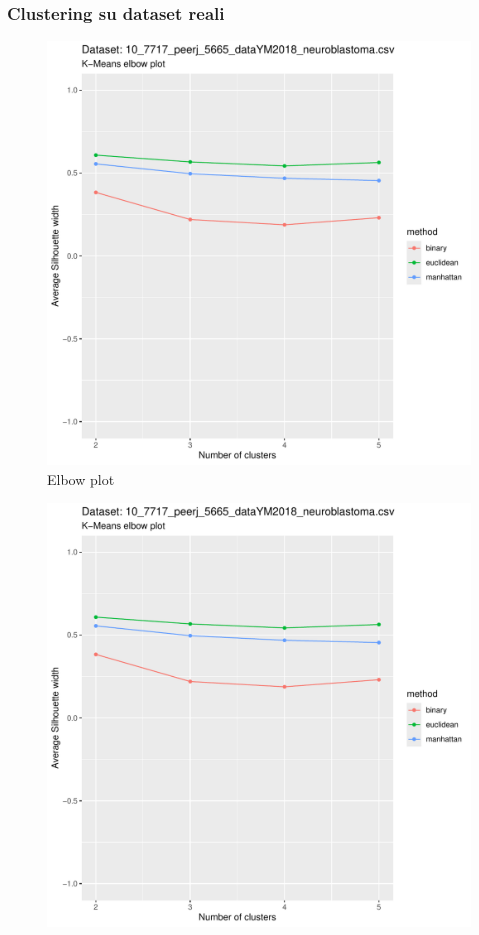 \documentclass{beamer}
\begin{document}
        \begin{frame}
            \frametitle{Clustering su dataset reali}

	    \centering
            \begin{boxedminipage}{0.49\textwidth}
                \begin{figure}
                    \includegraphics[width = \textwidth, page = 7]{results/results_Neuroblastoma.csv.pdf}
                    \caption{Elbow plot}
                \end{figure}
            \end{boxedminipage}
            \begin{boxedminipage}{0.49\textwidth}
                \begin{figure}
                    \includegraphics[width = \textwidth, page = 8]{results/results_Neuroblastoma.csv.pdf}

\end{figure}
\end{boxedminipage}
\end{frame}
\end{document}
